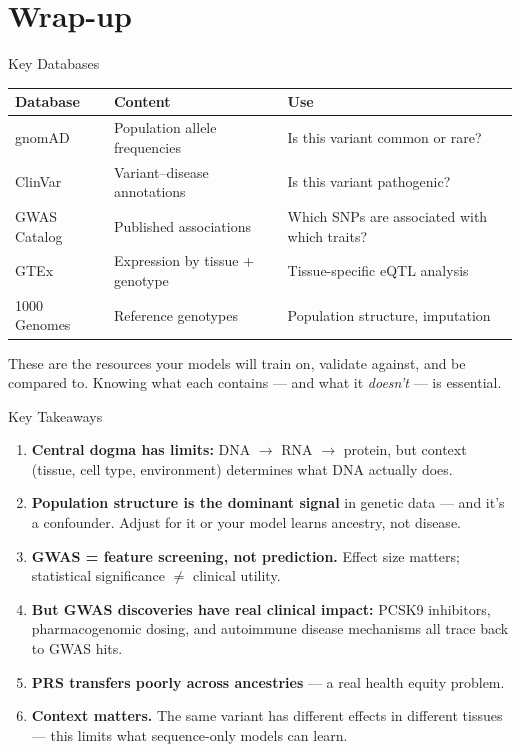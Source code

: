 \documentclass[aspectratio=169,10pt]{beamer}
\begin{document}
\section{Wrap-up}

\begin{frame}{Key Databases}
{\small
\begin{center}
\begin{tabular}{lll}
\toprule
\textbf{Database} & \textbf{Content} & \textbf{Use} \\
\midrule
gnomAD & Population allele frequencies & Is this variant common or rare? \\
ClinVar & Variant--disease annotations & Is this variant pathogenic? \\
GWAS Catalog & Published associations & Which SNPs are associated with which traits? \\
GTEx & Expression by tissue + genotype & Tissue-specific eQTL analysis \\
1000 Genomes & Reference genotypes & Population structure, imputation \\
\bottomrule
\end{tabular}
\end{center}}

\vspace{0.3em}
{\small These are the resources your models will train on, validate against, and be compared to. Knowing what each contains --- and what it \emph{doesn't} --- is essential.}
\end{frame}

\begin{frame}{Key Takeaways}
\begin{enumerate}[<+->]
    \item \textbf{Central dogma has limits:} DNA $\to$ RNA $\to$ protein, but context (tissue, cell type, environment) determines what DNA actually does.
    \item \textbf{Population structure is the dominant signal} in genetic data --- and it's a confounder. Adjust for it or your model learns ancestry, not disease.
    \item \textbf{GWAS = feature screening, not prediction.} Effect size matters; statistical significance $\neq$ clinical utility.
    \item \textbf{But GWAS discoveries have real clinical impact:} PCSK9 inhibitors, pharmacogenomic dosing, and autoimmune disease mechanisms all trace back to GWAS hits.
    \item \textbf{PRS transfers poorly across ancestries} --- a real health equity problem.
    \item \textbf{Context matters.} The same variant has different effects in different tissues --- this limits what sequence-only models can learn.
\end{enumerate}
\end{frame}
\end{document}
